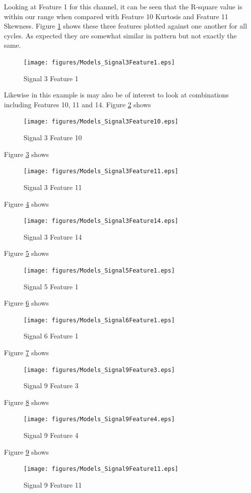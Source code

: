 \documentclass{article}
\begin{document}
Looking at Feature 1 for this channel, it can be seen that the R-square value is within our range when compared with Feature 10 Kurtosis and Feature 11 Skewness. Figure \ref{fig:Models_Signal3Feature1} shows these three features plotted against one another for all cycles. As expected they are somewhat similar in pattern but not exactly the same.
\begin{figure}[H]
    \centering
    \texttt{[image: figures/Models\_Signal3Feature1.eps]}
    \caption{Signal 3 Feature 1}
    \label{fig:Models_Signal3Feature1}
\end{figure}
Likewise in this example is may also be of interest to look at combinations including Features 10, 11 and 14.
Figure \ref{fig:Models_Signal3Feature10} shows 
\begin{figure}[H]
    \centering
    \texttt{[image: figures/Models\_Signal3Feature10.eps]}
    \caption{Signal 3 Feature 10}
    \label{fig:Models_Signal3Feature10}
\end{figure}
Figure \ref{fig:Models_Signal3Feature11} shows 
\begin{figure}[H]
    \centering
    \texttt{[image: figures/Models\_Signal3Feature11.eps]}
    \caption{Signal 3 Feature 11}
    \label{fig:Models_Signal3Feature11}
\end{figure}
Figure \ref{fig:Models_Signal3Feature14} shows 
\begin{figure}[H]
    \centering
    \texttt{[image: figures/Models\_Signal3Feature14.eps]}
    \caption{Signal 3 Feature 14}
    \label{fig:Models_Signal3Feature14}
\end{figure}


Figure \ref{fig:Models_Signal5Feature1} shows 
\begin{figure}[H]
    \centering
    \texttt{[image: figures/Models\_Signal5Feature1.eps]}
    \caption{Signal 5 Feature 1}
    \label{fig:Models_Signal5Feature1}
\end{figure}



Figure \ref{fig:Models_Signal6Feature1} shows 
\begin{figure}[H]
    \centering
    \texttt{[image: figures/Models\_Signal6Feature1.eps]}
    \caption{Signal 6 Feature 1}
    \label{fig:Models_Signal6Feature1}
\end{figure}


Figure \ref{fig:Models_Signal9Feature3} shows 
\begin{figure}[H]
    \centering
    \texttt{[image: figures/Models\_Signal9Feature3.eps]}
    \caption{Signal 9 Feature 3}
    \label{fig:Models_Signal9Feature3}
\end{figure}
Figure \ref{fig:Models_Signal9Feature4} shows 
\begin{figure}[H]
    \centering
    \texttt{[image: figures/Models\_Signal9Feature4.eps]}
    \caption{Signal 9 Feature 4}
    \label{fig:Models_Signal9Feature4}
\end{figure}
Figure \ref{fig:Models_Signal9Feature11} shows 
\begin{figure}[H]
    \centering
    \texttt{[image: figures/Models\_Signal9Feature11.eps]}
    \caption{Signal 9 Feature 11}
    \label{fig:Models_Signal9Feature11}
\end{figure}
\end{document}
